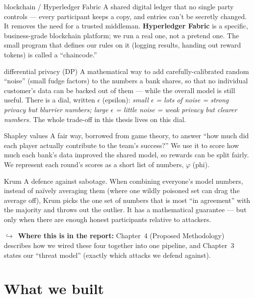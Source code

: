 \documentclass[11pt]{article}
\newcommand{\reportnote}[1]{%
  \par\vspace{3pt}%
  {\small\color{soft}$\hookrightarrow$\ \textbf{Where this is in the report:} #1}\par\vspace{2pt}}
\begin{document}
\begin{plain}{blockchain / Hyperledger Fabric}
A shared digital ledger that no single party controls --- every participant keeps a copy, and entries
can't be secretly changed. It removes the need for a trusted middleman. \textbf{Hyperledger Fabric} is
a specific, business-grade blockchain platform; we run a real one, not a pretend one. The small program
that defines our rules on it (logging results, handing out reward tokens) is called a ``chaincode.''
\end{plain}

\begin{plain}{differential privacy (DP)}
A mathematical way to add carefully-calibrated random ``noise'' (small fudge factors) to the numbers a
bank shares, so that no individual customer's data can be backed out of them --- while the overall
model is still useful. There is a dial, written $\epsilon$ (epsilon): \emph{small $\epsilon$ = lots of
noise = strong privacy but blurrier numbers; large $\epsilon$ = little noise = weak privacy but clearer
numbers.} The whole trade-off in this thesis lives on this dial.
\end{plain}

\begin{plain}{Shapley values}
A fair way, borrowed from game theory, to answer ``how much did each player actually contribute to the
team's success?'' We use it to score how much each bank's data improved the shared model, so rewards
can be split fairly. We represent each round's scores as a short list of numbers, $\varphi$ (phi).
\end{plain}

\begin{plain}{Krum}
A defence against sabotage. When combining everyone's model numbers, instead of naïvely averaging them
(where one wildly poisoned set can drag the average off), Krum picks the one set of numbers that is
most ``in agreement'' with the majority and throws out the outlier. It has a mathematical guarantee ---
but only when there are enough honest participants relative to attackers.
\end{plain}

\reportnote{Chapter~4 (Proposed Methodology) describes how we wired these four together into one
pipeline, and Chapter~3 states our ``threat model'' (exactly which attacks we defend against).}

\section{What we built}
\end{document}
